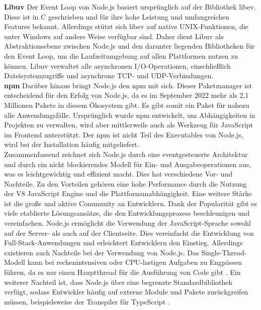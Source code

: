 \noindent
\textbf{Libuv} \newline
Der Event Loop von Node.js basiert ursprünglich auf der Bibliothek libev. Diese ist in C geschrieben und für ihre hohe Leistung und umfangreichen Features bekannt. Allerdings stützt sich libev auf native UNIX-Funktionen, die unter Windows auf andere Weise verfügbar sind. Daher dient Libuv als Abstraktionsebene zwischen Node.js und den darunter liegenden Bibliotheken für den Event Loop, um die Laufzeitumgebung auf allen Plattformen nutzen zu können. Libuv verwaltet alle asynchronen I/O-Operationen, einschließlich Dateisystemzugriffe und asynchrone TCP- und UDP-Verbindungen.\cite{Springer.2022} \\

\noindent
\textbf{\ac{npm}} \newline
Darüber hinaus bringt Node.js den \ac{npm} mit sich. Dieser Paketmanager ist entscheidend für den Erfolg von Node.js, da es im September 2022 mehr als 2,1 Millionen Pakete in diesem Ökosystem gibt. Es gibt somit ein Paket für nahezu alle Anwendungsfälle. Ursprünglich wurde \ac{npm} entwickelt, um Abhängigkeiten in Projekten zu verwalten, wird aber mittlerweile auch als Werkzeug für JavaScript im Frontend unterstützt. Der \ac{npm} ist nicht Teil des Executables von Node.js, wird bei der Installation häufig mitgeliefert. \cite{Springer.2022, OpenJSFoundation.2022b}\\

\noindent
Zusammenfassend zeichnet sich Node.js durch eine eventgesteuerte Architektur und durch ein nicht blockierendes Modell für Ein- und Ausgabeoperationen aus, was es leichtgewichtig und effizient macht. Dies hat verschiedene Vor- und Nachteile. \newline
Zu den Vorteilen gehören eine hohe Performance durch die Nutzung der V8 JavaScript Engine und die Plattformunabhängigkeit. Eine weitere Stärke ist die große und aktive Community an Entwicklern. Dank der Popularität gibt es viele etablierte Lösungsansätze, die den Entwicklungsprozess beschleunigen und vereinfachen. Node.js ermöglicht die Verwendung der JavaScript-Sprache sowohl auf der Server- als auch auf der Clientseite. Dies vereinfacht die Entwicklung von Full-Stack-Anwendungen und erleichtert Entwicklern den Einstieg.\cite{Brown.November2019, OpenJSFoundation.2022b} \newline
Allerdings existieren auch Nachteile bei der Verwendung von Node.js. Das Single-Thread-Modell kann bei rechenintensiven oder CPU-lastigen Aufgaben zu Engpässen führen, da es nur einen Hauptthread für die Ausführung von Code gibt  \cite{Chhetri.2016}. Ein weiterer Nachteil ist, dass Node.js über eine begrenzte Standardbibliothek verfügt, sodass Entwickler häufig auf externe Module und Pakete zurückgreifen müssen, beispielsweise der Transpiler für TypeScript \cite{OpenJSFoundation.2022b}.

